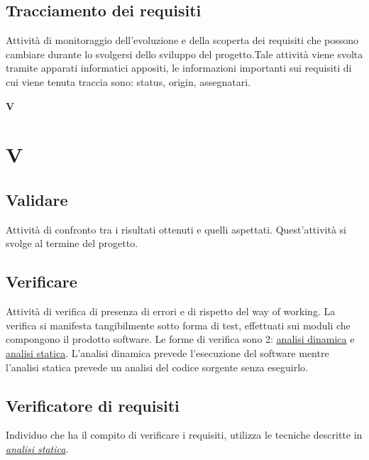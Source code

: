 	\subsection{Tracciamento dei requisiti}
	\label{sec:tracciamentorequisiti}
	Attività di monitoraggio dell'evoluzione e della scoperta dei requisiti che possono cambiare durante lo svolgersi dello sviluppo del progetto.Tale attività viene svolta tramite apparati informatici appositi, le informazioni importanti sui requisiti di cui viene tenuta traccia sono: status, origin, assegnatari.\newpage

	{\Huge{\textbf{V}}} \\
	\section{V}
	
	\subsection{Validare}
	\label{sec:validare}
	Attività di confronto tra i risultati ottenuti e quelli aspettati. Quest'attività si svolge al termine del progetto.
	
	\subsection{Verificare}
	\label{sec:verificare}
	Attività di verifica di presenza di errori e di rispetto del way of working. La verifica si manifesta tangibilmente sotto forma di test, effettuati sui moduli che compongono il prodotto software. Le forme di verifica sono 2: \hyperref[sec:analisidinamica]{\underline{analisi dinamica}} e \hyperref[sec:analisistatica]{\underline{analisi statica}}. L'analisi dinamica prevede l'esecuzione del software mentre l'analisi statica prevede un analisi del codice sorgente senza eseguirlo. 
	
	\subsection{Verificatore di requisiti}
	\label{sec:verificatorerequisiti}
	Individuo che ha il compito di verificare i requisiti, utilizza le tecniche descritte in \emph{\hyperref[sec:analisistatica]{analisi statica}}.
	
